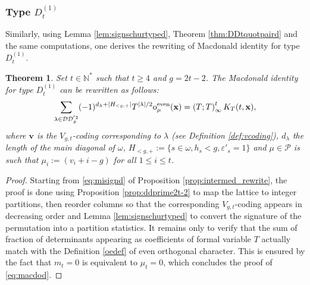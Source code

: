 \documentclass[11pt,letterpaper]{amsart}
\def\ccdd{\mathcal {DD}}
\def\ccp{\mathcal P}
\newtheorem{thm}[df]{Theorem}
\renewcommand{\oe}{\mathrm{o}^{\text{even}}}
\numberwithin{equation}{section}
\numberwithin{df}{section}
\begin{document}
\subsubsection{Type $D^{(1)}_{t}$}
Similarly, using Lemma \ref{lem:signschurtyped}, Theorem \ref{thm:DDtquotpaird} and the same computations, one derives the rewriting of Macdonald identity for type $D^{(1)}_{t}$.
\begin{thm}\label{prop:Macdotyped}
Set $t\in\mathbb{N}^*$ such that $t\geq 4$ and $g=2t-2$. The Macdonald identity for type $D^{(1)}_{t}$ can be rewritten as follows:
\begin{equation}\label{eq:macdod}
\sum_{\lambda\in\ccdd_{g}^{'2}} (-1)^{d_{\lambda}+\lvert H_{<g,+}\rvert}T^{\lvert\lambda\rvert/2}\oe_{\mu}({\bf x})=
\left(T;T\right)_\infty^{t} K_T(t,\mathbf{x}),
\end{equation}
where $\mathbf{v}$ is the $V_{g,t}$-coding corresponding to $\lambda$ (see Definition \ref{def:vcoding}), $d_\lambda$ the length of the main diagonal of $\omega$, $H_{<g,+}:=\lbrace s\in\omega, h_s<g, \varepsilon'_s=1\rbrace$ and $\mu\in\ccp$ is such that
$\mu_i:=\left(v_i+i-g\right)$ for all $1\leq i \leq t$.
\end{thm}
\begin{proof}

Starting from \eqref{eq:misignd} of Proposition \ref{prop:intermed_rewrite}, the proof is done using Proposition \ref{prop:ddprime2t-2} to map the lattice to integer partitions, then reorder columns so that the corresponding $V_{g,t}$-coding appears in decreasing order and Lemma \ref{lem:signschurtyped} to convert the signature of the permutation into a partition statistics. It remains only to verify that the sum of fraction of determinants appearing as coefficients of formal variable $T$ actually match with the  Definition \ref{oedef} of even orthogonal character. This is ensured by the fact that $m_t=0$ is equivalent to $\mu_t=0$, which concludes the proof of \eqref{eq:macdod}.
\end{proof}
\end{document}
